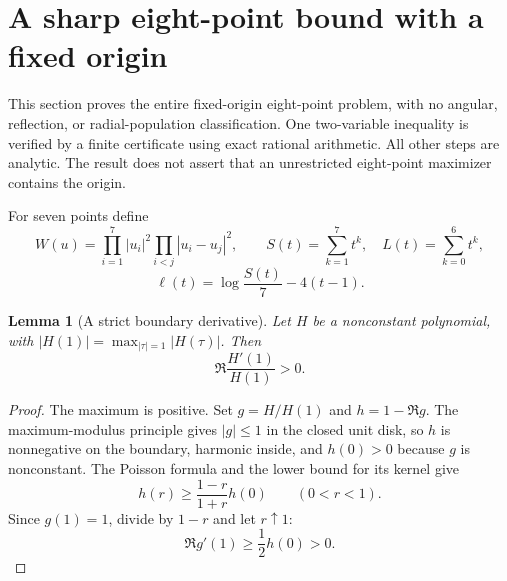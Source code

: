 \documentclass[11pt]{article}
\newtheorem{lemma}[theorem]{Lemma}
\theoremstyle{remark}
\numberwithin{equation}{section}
\begin{document}
\section{A sharp eight-point bound with a fixed origin}
\label{sec:noclass-origin8}

This section proves the entire fixed-origin eight-point problem, with
no angular, reflection, or radial-population classification. One
two-variable inequality is verified by a finite certificate using exact
rational arithmetic. All other steps are analytic. The result does not
assert that an unrestricted eight-point maximizer contains the origin.

For seven points define
\[
 W(u)=\prod_{i=1}^7|u_i|^2\prod_{i<j}|u_i-u_j|^2,\qquad
 S(t)=\sum_{k=1}^7t^k,\quad L(t)=\sum_{k=0}^6t^k,
\]
\[
 \ell(t)=\log\frac{S(t)}7-4(t-1).
\]

\begin{lemma}[A strict boundary derivative]
\label{lem:noclass-boundary}
Let $H$ be a nonconstant polynomial, with
$|H(1)|=\max_{|\tau|=1}|H(\tau)|$. Then
\[
 \Re\frac{H'(1)}{H(1)}>0.
\]
\end{lemma}
\begin{proof}
The maximum is positive. Set $g=H/H(1)$ and
$h=1-\Re g$. The maximum-modulus principle gives $|g|\le1$
in the closed unit disk, so $h$ is nonnegative on the boundary,
harmonic inside, and $h(0)>0$ because $g$ is nonconstant.
The Poisson formula and the lower bound for its kernel give
\[
 h(r)\ge\frac{1-r}{1+r}h(0)\qquad(0<r<1).
\]
Since $g(1)=1$, divide by $1-r$ and let $r\uparrow1$:
\[
 \Re g'(1)\ge\frac12h(0)>0.
\]
\end{proof}
\end{document}
